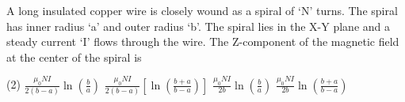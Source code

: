 
\item A long insulated copper wire is closely wound as a spiral of `N' turns. The spiral has inner radius `a' and outer radius `b'. The spiral lies in the X-Y plane and a steady current `I' flows through the wire. The Z-component of the magnetic field at the center of the spiral is
    \begin{center}
    \end{center}
    \begin{tasks}(2)
        \task $\frac{\mu_0 N I}{2(b-a)} \ln\left(\frac{b}{a}\right)$
        \task $\frac{\mu_0 N I}{2(b-a)} \left[\ln\left(\frac{b+a}{b-a}\right)\right]$
        \task $\frac{\mu_0 N I}{2b} \ln\left(\frac{b}{a}\right)$
        \task $\frac{\mu_0 N I}{2b} \ln\left(\frac{b+a}{b-a}\right)$
    \end{tasks}
